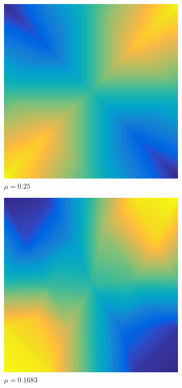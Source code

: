 \documentclass[../fem.tex]{subfile}
\begin{document}
\begin{figure}[htpb]
  \begin{subfigure}{0.4\textwidth}
    \centering
    \includegraphics[width=0.8\linewidth]{figures/r1/approx.png}
    \caption{$\mu=0.25$}
  \end{subfigure}
  \begin{subfigure}{0.4\textwidth}
    \centering
    \includegraphics[width=0.8\linewidth]{figures/r2/approx.png}
    \caption{$\mu=0.1683$}
  \end{subfigure}
  \begin{subfigure}{0.4\textwidth}
    \centering

\end{subfigure}
\end{figure}
\end{document}
